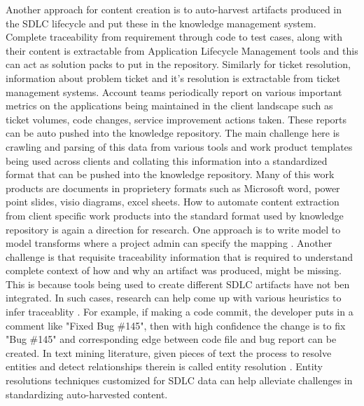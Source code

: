 Another approach for content creation is to auto-harvest artifacts produced in the SDLC lifecycle and put these in the knowledge management system. Complete traceability from requirement through code to test cases, along with their content is extractable from Application Lifecycle Management tools and this can act as solution packs to put in the repository. Similarly for ticket resolution, information about problem ticket and it's resolution is extractable from ticket management systems. Account teams periodically report on various important metrics on the applications being maintained in the client landscape such as ticket volumes, code changes, service improvement actions taken. These reports can be auto pushed into the knowledge repository. The main challenge here is crawling and parsing of this data from various tools and work product templates being used across clients and collating this information into a standardized format that can be pushed into the knowledge repository. Many of this work products are documents in proprietery formats such as Microsoft word, power point slides, visio diagrams, excel sheets. How to automate content extraction from client specific work products into the standard format used by knowledge repository is again a direction for research. One approach is to write model to model transforms where a project admin can specify the mapping \cite{debdoot:2010:scc}. Another challenge is that requisite traceability information that is required to understand complete context of how and why an artifact was produced, might be missing. This is because tools being used to create different SDLC artifacts have not ben integrated. In such cases, research can help come up with various heuristics to infer traceablity \cite{}. For example, if making a code commit, the developer puts in a comment like "Fixed Bug \#145", then with high confidence the change is to fix "Bug \#145" and corresponding edge between code file and bug report can be created. In text mining literature, given pieces of text the process to resolve entities and detect relationships therein is called entity resolution \cite{}. Entity resolutions techniques customized for SDLC data can help alleviate challenges in standardizing auto-harvested content.

